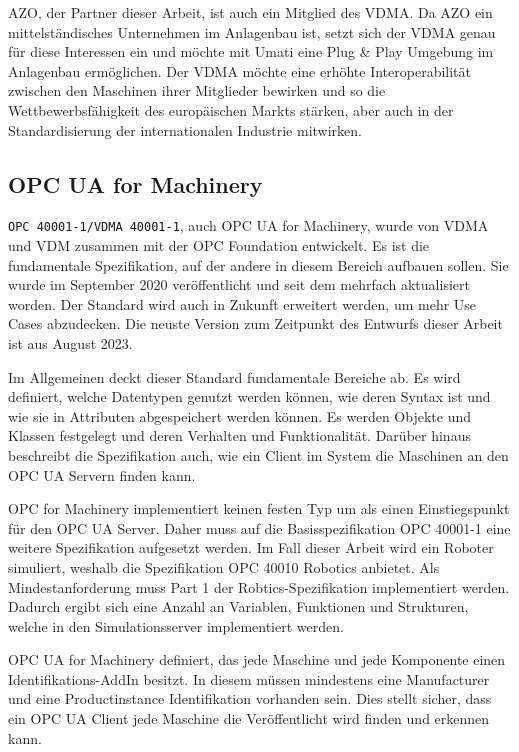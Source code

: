 \documentclass[a4paper, 12pt, oneside, toc=listofnumbered, bibliography=totoc]{scrbook}
\begin{document}
		AZO, der Partner dieser Arbeit, ist auch ein Mitglied des VDMA. Da AZO ein mittelständisches Unternehmen im Anlagenbau ist, setzt sich der VDMA genau für diese Interessen ein und möchte mit \ac{Umati} eine Plug \& Play Umgebung im Anlagenbau ermöglichen. Der VDMA möchte eine erhöhte Interoperabilität zwischen den Maschinen ihrer Mitglieder bewirken und so die Wettbewerbsfähigkeit des europäischen Markts stärken, aber auch in der Standardisierung der internationalen Industrie mitwirken. 
		
		\subsection{OPC UA for Machinery}
		
		\texttt{OPC 40001-1/VDMA 40001-1}, auch OPC UA for Machinery, wurde von VDMA und VDM zusammen mit der OPC Foundation entwickelt. Es ist die fundamentale Spezifikation, auf der andere in diesem Bereich aufbauen sollen. Sie wurde im September 2020 veröffentlicht und seit dem mehrfach aktualisiert worden. Der Standard wird auch in Zukunft erweitert werden, um mehr Use Cases abzudecken. Die neuste Version zum Zeitpunkt des Entwurfs dieser Arbeit ist aus August 2023.
		
		Im Allgemeinen deckt dieser Standard fundamentale Bereiche ab. Es wird definiert, welche Datentypen genutzt werden können, wie deren Syntax ist und wie sie in Attributen abgespeichert werden können. Es werden Objekte und Klassen festgelegt und deren Verhalten und Funktionalität. Darüber hinaus beschreibt die Spezifikation auch, wie ein Client im System die Maschinen an den OPC UA Servern finden kann. 
		
		OPC for Machinery implementiert keinen festen Typ um als einen Einstiegspunkt für den OPC UA Server. Daher muss auf die Basisspezifikation OPC 40001-1 eine weitere Spezifikation aufgesetzt werden. Im Fall dieser Arbeit wird ein Roboter simuliert, weshalb die Spezifikation OPC 40010 Robotics anbietet. Als Mindestanforderung muss Part 1 der Robtics-Spezifikation implementiert werden. Dadurch ergibt sich eine Anzahl an Variablen, Funktionen und Strukturen, welche in den Simulationsserver implementiert werden.
		
		OPC UA for Machinery definiert, das jede Maschine und jede Komponente einen Identifikations-AddIn besitzt. In diesem müssen mindestens eine Manufacturer und eine Productinstance Identifikation vorhanden sein. Dies stellt sicher, dass ein OPC UA Client jede Maschine die Veröffentlicht wird finden und erkennen kann.  
		
\end{document}
